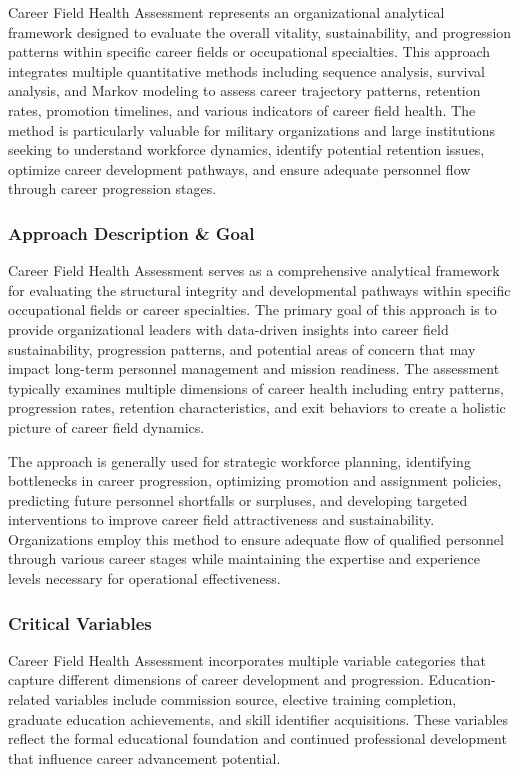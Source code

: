 \documentclass[main.tex]{subfiles}
\begin{document}
Career Field Health Assessment represents an organizational analytical framework designed to evaluate the overall vitality, sustainability, and progression patterns within specific career fields or occupational specialties. This approach integrates multiple quantitative methods including sequence analysis, survival analysis, and Markov modeling to assess career trajectory patterns, retention rates, promotion timelines, and various indicators of career field health. The method is particularly valuable for military organizations and large institutions seeking to understand workforce dynamics, identify potential retention issues, optimize career development pathways, and ensure adequate personnel flow through career progression stages.

\subsubsection{Approach Description \& Goal}

Career Field Health Assessment serves as a comprehensive analytical framework for evaluating the structural integrity and developmental pathways within specific occupational fields or career specialties. The primary goal of this approach is to provide organizational leaders with data-driven insights into career field sustainability, progression patterns, and potential areas of concern that may impact long-term personnel management and mission readiness\parencite{afpc2005}. The assessment typically examines multiple dimensions of career health including entry patterns, progression rates, retention characteristics, and exit behaviors to create a holistic picture of career field dynamics.

The approach is generally used for strategic workforce planning, identifying bottlenecks in career progression, optimizing promotion and assignment policies, predicting future personnel shortfalls or surpluses, and developing targeted interventions to improve career field attractiveness and sustainability. Organizations employ this method to ensure adequate flow of qualified personnel through various career stages while maintaining the expertise and experience levels necessary for operational effectiveness.

\subsubsection{Critical Variables}

Career Field Health Assessment incorporates multiple variable categories that capture different dimensions of career development and progression. Education-related variables include commission source, elective training completion, graduate education achievements, and skill identifier acquisitions\parencite{potential2024}. These variables reflect the formal educational foundation and continued professional development that influence career advancement potential.
\end{document}
